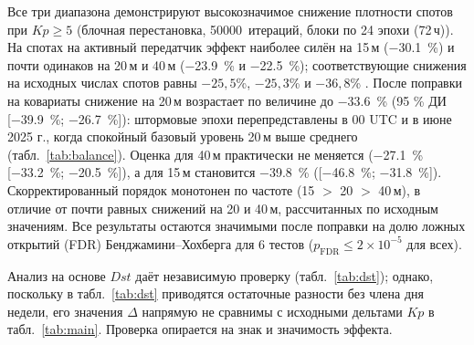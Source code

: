 \documentclass{agujournal2019}
\providecommand{\DIFaddtex}[1]{{\protect\color{blue}\uwave{#1}}} %
\providecommand{\DIFaddbegin}{} %
\providecommand{\DIFaddend}{} %
\providecommand{\DIFadd}[1]{\texorpdfstring{\DIFaddtex{#1}}{#1}} %
\providecommand{\DIFaddincludegraphics}[2][]{{\color{blue}\fbox{\DIFOincludegraphics[#1]{#2}}}} %
\DeclareRobustCommand{\DIFaddbegin}{\DIFOaddbegin \let\includegraphics\DIFaddincludegraphics} %
\DeclareRobustCommand{\DIFaddend}{\DIFOaddend \let\includegraphics\DIFOincludegraphics} %
\begin{document}
Все три диапазона демонстрируют высокозначимое снижение плотности спотов
при $Kp \ge 5$ (блочная перестановка, \SI{50000}{\mbox{итераций}},
блоки по 24 эпохи (72\,ч)). На спотах на активный передатчик эффект
наиболее силён на 15\,м (\SI{-30,1}{\percent}) и почти
одинаков на 20\,м и 40\,м (\SI{-23,9}{\percent} и
\SI{-22,5}{\percent}); соответствующие снижения на исходных
числах спотов равны $-25{,}5$\%, $-25{,}3$\% и $-36{,}8$\% \DIFaddbegin \DIFadd{(без вспышек, 169 эпох)}\DIFaddend . После поправки на
ковариаты снижение на 20\,м возрастает по величине до \SI{-33.6}{\percent}
(95 \% ДИ [\SI{-39.9}{\percent}; \SI{-26.7}{\percent}]): штормовые эпохи
перепредставлены в 00 UTC и в июне 2025 г., когда спокойный базовый
уровень 20\,м выше среднего (табл.~\ref{tab:balance}). Оценка для 40\,м
практически не меняется (\SI{-27.1}{\percent}
[\SI{-33.2}{\percent}; \SI{-20.5}{\percent}]), а для 15\,м становится
\SI{-39.8}{\percent} ([\SI{-46.8}{\percent}; \SI{-31.8}{\percent}]).
Скорректированный порядок монотонен по частоте (15 $>$ 20 $>$ 40\,м),
в отличие от почти равных снижений на 20 и 40\,м, рассчитанных по исходным
значениям. Все результаты
остаются значимыми после поправки на долю ложных открытий (FDR)
Бенджамини--Хохберга для 6 тестов
($p_{\text{FDR}} \le 2 \times 10^{-5}$ для всех).

Анализ на основе $Dst$ даёт независимую проверку
(табл.~\ref{tab:dst}); однако, поскольку в табл.~\ref{tab:dst} приводятся
остаточные разности без члена дня недели, его значения $\Delta$ напрямую
не сравнимы с исходными дельтами $Kp$ в табл.~\ref{tab:main}. Проверка
опирается на знак и значимость эффекта.
\end{document}
